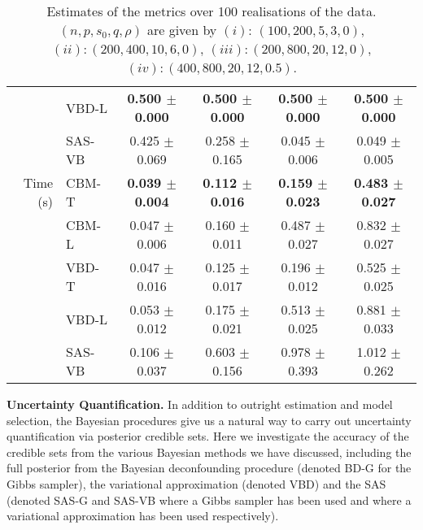 \documentclass[11pt]{article}
\newcommand{\subparspacenonewline}{\vspace{3mm}}
\begin{document}
\begin{table}
{\begin{tabular}{r|l|cccc}
              & VBD-L & \textbf{0.500 $\pm$ 0.000} & \textbf{0.500 $\pm$ 0.000} & \textbf{0.500 $\pm$ 0.000} & \textbf{0.500 $\pm$ 0.000}\\
              & SAS-VB  & 0.425 $\pm$ 0.069          & 0.258 $\pm$ 0.165          & 0.045 $\pm$ 0.006          & 0.049 $\pm$ 0.005\\
\hline
Time (s)      & CBM-T   & \textbf{0.039 $\pm$ 0.004} & \textbf{0.112 $\pm$ 0.016} & \textbf{0.159 $\pm$ 0.023} & \textbf{0.483 $\pm$ 0.027}\\
              & CBM-L   & 0.047 $\pm$ 0.006          & 0.160 $\pm$ 0.011          & 0.487 $\pm$ 0.027          & 0.832 $\pm$ 0.027\\
              & VBD-T & 0.047 $\pm$ 0.016          & 0.125 $\pm$ 0.017          & 0.196 $\pm$ 0.012          & 0.525 $\pm$ 0.025\\
              & VBD-L & 0.053 $\pm$ 0.012          & 0.175 $\pm$ 0.021          & 0.513 $\pm$ 0.025          & 0.881 $\pm$ 0.033\\
              & SAS-VB  & 0.106 $\pm$ 0.037          & 0.603 $\pm$ 0.156          & 0.978 $\pm$ 0.393          & 1.012 $\pm$ 0.262\\
\bottomrule
\end{tabular}
}
\caption{Estimates of the metrics over 100 realisations of the data. $(n, p, s_0, q, \rho)$ are given by $(i)$: $(100, 200, 5, 3, 0)$, $(ii): (200, 400, 10, 6, 0)$, $(iii): (200, 800, 20, 12, 0)$, $(iv): (400, 800, 20, 12, 0.5)$.}\label{Tab:large_experiments}
\end{table}

\subparspacenonewline
{\bf Uncertainty Quantification.}
In addition to outright estimation and model selection, the Bayesian procedures give us a natural way to carry out uncertainty quantification via posterior credible sets. Here we investigate the accuracy of the credible sets from the various Bayesian methods we have discussed, including the full posterior from the Bayesian deconfounding procedure (denoted BD-G for the Gibbs sampler), the variational approximation (denoted VBD) and the SAS (denoted SAS-G and SAS-VB where a Gibbs sampler has been used and where a variational approximation has been used respectively). 
\end{document}
